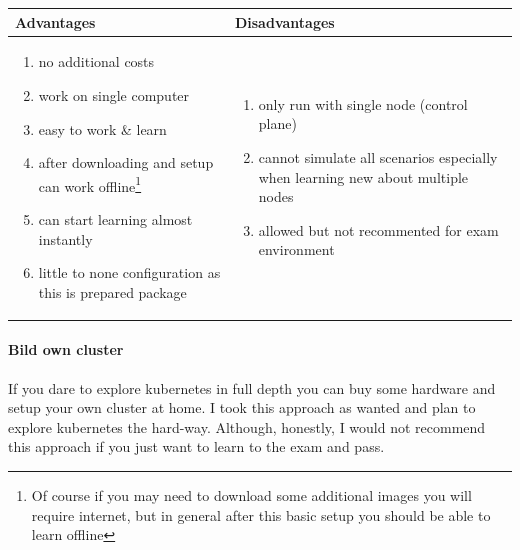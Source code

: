 \begin{tabularx}{\textwidth}{|X|X|}
	\hline
	\textbf{Advantages} & \textbf{Disadvantages} \\
	\hline
	\begin{enumerate}
		\item no additional costs
		\item work on single computer
		\item easy to work \& learn
		\item after downloading and setup can work offline\footnote{Of course if you may need to download some additional images you will require internet, but in general after this basic setup you should be able to learn offline}
		\item can start learning almost instantly
		\item little to none configuration as this is prepared package
	\end{enumerate}
	
	&
	
	\begin{enumerate}
		\item only run with single node (control plane)
		\item cannot simulate all scenarios especially when learning new about multiple nodes
		\item allowed but not recommented for exam environment
	\end{enumerate}\\
	\hline
\end{tabularx}

\paragraph{Bild own cluster} If you dare to explore kubernetes in full depth you can buy some hardware and setup your own cluster at home. I took this approach as wanted and plan to explore kubernetes the hard-way. Although, honestly, I would not recommend this approach if you just want to learn to the exam and pass.\\

